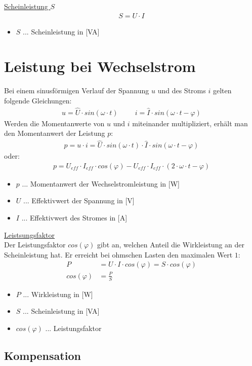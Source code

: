 \underline{Scheinleistung $S$}
\begin{align}
    S = U \cdot I
\end{align}
\begin{itemize}
    \item $S$ ... Scheinleistung in [VA]
\end{itemize}

\newpage

\section{Leistung bei Wechselstrom}
Bei einem sinusförmigen Verlauf der Spannung $u$ und des Stroms $i$ gelten folgende Gleichungen:
\begin{align}
    u = \hat{U} \cdot sin(\omega \cdot t) \hspace{1cm} i = \hat{I} \cdot sin(\omega \cdot t - \varphi)
\end{align}
Werden die Momentanwerte von $u$ und $i$ miteinander multipliziert, erhält man den Momentanwert der Leistung $p$:
\begin{align}
    p = u \cdot i = \hat{U} \cdot sin(\omega \cdot t) \cdot \hat{I} \cdot sin(\omega \cdot t - \varphi)
\end{align}
oder:
\begin{align}
    p = U_{eff} \cdot I_{eff} \cdot cos(\varphi) - U_{eff} \cdot I_{eff} \cdot (2\cdot \omega \cdot t - \varphi)
\end{align}

\begin{itemize}
    \item $p$ ... Momentanwert der Wechselstromleistung in [W]
    \item $U$ ... Effektivwert der Spannung in [V]
    \item $I$ ... Effektivwert des Stromes in [A]
\end{itemize}

\underline{Leistsungsfaktor} \\
Der Leistungsfaktor $cos(\varphi)$ gibt an, welchen Anteil die Wirkleistung an der Scheinleistung hat. Er erreicht bei ohmschen Lasten den maximalen Wert $1$:
\begin{align}
    P &= U \cdot I \cdot cos(\varphi) = S \cdot cos(\varphi) \\
    cos(\varphi) &= \frac{P}{S} 
\end{align}
\begin{itemize}
    \item $P$ ... Wirkleistung in [W]
    \item $S$ ... Scheinleistung in [VA]
    \item $cos(\varphi)$ ... Leistungsfaktor
\end{itemize}

\subsection{Kompensation}